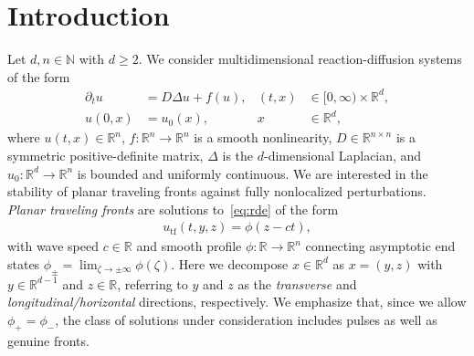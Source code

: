 \documentclass[12pt,oneside,a4paper,reqno]{amsart}
\numberwithin{equation}{section}
\theoremstyle{definition}
\theoremstyle{remark}
\newcommand{\bbN}{{\mathbb N}}
\newcommand{\bbR}{{\mathbb R}}
\begin{document}
\section{Introduction}
Let $d,n \in \bbN$ with $d \geq 2$. We consider multidimensional reaction-diffusion systems of the form
\begin{subequations}
\label{eq:rdefull}
\begin{align}
    \label{eq:rde}
	\partial_t u &= D\Delta u + f(u), 
	& (t,x) &\in [0,\infty) \times \bbR^{d}, \\
    \label{eq:rdeic}
    u(0,x) &= u_0(x), &  x &\in \bbR^d,
\end{align}
\end{subequations}
where $u(t,x) \in \bbR^n$, $f \colon \bbR^n \to \bbR^n$ is a smooth nonlinearity, $D \in \bbR^{n \times n}$ is a symmetric positive-definite matrix, $\Delta$ is the $d$-dimensional Laplacian, and $u_0 \colon \bbR^d \to \bbR^n$ is bounded and uniformly continuous. We are interested in the stability of planar traveling fronts against fully nonlocalized perturbations. \emph{Planar traveling fronts} are solutions to~\eqref{eq:rde} of the form
\begin{align}
    \label{eq:travelingfront}
	u_{\mathrm{tf}}(t,y,z) = \phi(z - ct),
\end{align}
with wave speed $c \in \bbR$ and smooth profile $\phi \colon \bbR \to \bbR^n$ connecting asymptotic end states $\phi_\pm = \lim_{\zeta \to \pm \infty} \phi(\zeta)$. Here we decompose $x \in \bbR^d$ as $x = (y,z)$ with $y \in \bbR^{d-1}$ and $z \in \bbR$, referring to $y$ and $z$ as the \emph{transverse} and \emph{longitudinal/horizontal} directions, respectively. We emphasize that, since we allow $\phi_+ = \phi_-$, the class of solutions under consideration includes pulses as well as genuine fronts.
\end{document}
